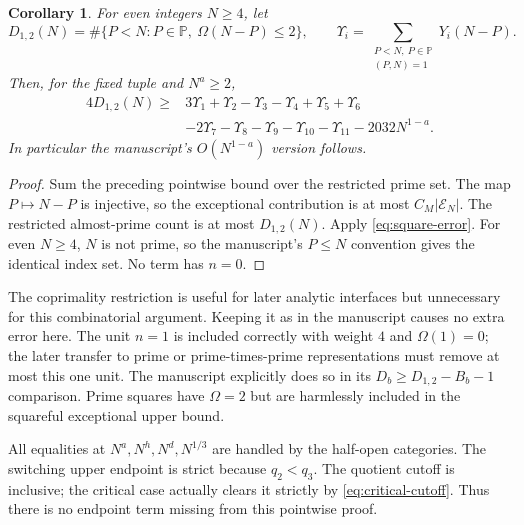 \documentclass[11pt]{article}
\newtheorem{corollary}[theorem]{Corollary}
\newcommand{\PP}{\mathbb P}
\newcommand{\Om}{\Omega}
\begin{document}
\begin{corollary}\label{cor:summed}
For even integers $N\ge4$, let
\[
 D_{1,2}(N)=\#\{P<N:P\in\PP,\ \Om(N-P)\le2\},\qquad
 \Upsilon_i=\sum_{\substack{P<N,\ P\in\PP\\(P,N)=1}}Y_i(N-P).
\]
Then, for the fixed tuple and $N^a\ge2$,
\begin{align*}
 4D_{1,2}(N)\ge{}&3\Upsilon_1+\Upsilon_2-\Upsilon_3-\Upsilon_4
                  +\Upsilon_5+\Upsilon_6\\
 &-2\Upsilon_7-\Upsilon_8-\Upsilon_9-\Upsilon_{10}-\Upsilon_{11}
                  -2032N^{1-a}.
\end{align*}
In particular the manuscript's $O(N^{1-a})$ version follows.
\end{corollary}
\begin{proof}
Sum the preceding pointwise bound over the restricted prime set. The
map $P\mapsto N-P$ is injective, so the exceptional contribution is at
most $C_M|\mathcal E_N|$. The restricted almost-prime count is at most
$D_{1,2}(N)$. Apply \eqref{eq:square-error}. For even $N\ge4$, $N$ is
not prime, so the manuscript's $P\le N$ convention gives the identical
index set. No term has $n=0$.
\end{proof}

The coprimality restriction is useful for later analytic interfaces but
unnecessary for this combinatorial argument. Keeping it as in the
manuscript causes no extra error here. The unit $n=1$ is included
correctly with weight $4$ and $\Om(1)=0$; the later transfer to prime
or prime-times-prime representations must remove at most this one
unit. The manuscript explicitly does so in its $D_b\ge D_{1,2}-B_b-1$
comparison. Prime squares have $\Om=2$ but are harmlessly included in
the squareful exceptional upper bound.

All equalities at $N^a,N^h,N^d,N^{1/3}$ are handled by the half-open
categories. The switching upper endpoint is strict because $q_2<q_3$.
The quotient cutoff is inclusive; the critical case actually clears it
strictly by \eqref{eq:critical-cutoff}. Thus there is no endpoint term
missing from this pointwise proof.
\end{document}
